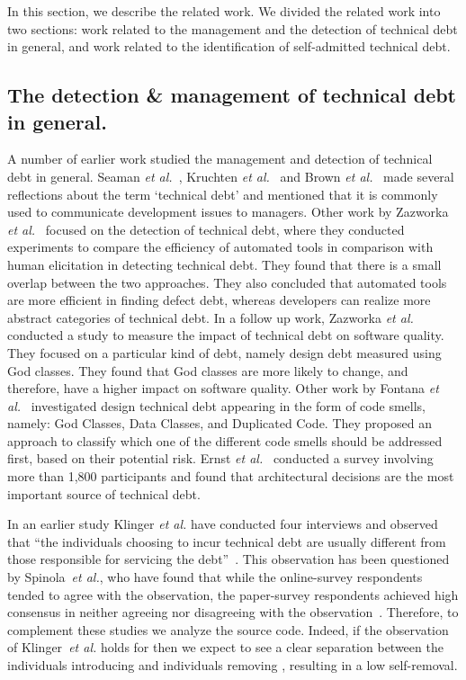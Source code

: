 
In this section, we describe the related work. We divided the related work into two sections: work related to the management and the detection of technical debt in general, and work related to the identification of self-admitted technical debt.

\subsection{The detection \& management of technical debt in general.} A number of earlier work studied the management and detection of technical debt in general. Seaman \textit{et al.}~\cite{Seaman2011}, Kruchten \textit{et al.}~\cite{Kruchten2013IWMTD} and Brown \textit{et al.}~\cite{Brown2010MTD} made several reflections about the term `technical debt' and mentioned that it is commonly used to communicate development issues to managers. Other work by Zazworka \textit{et al.}~\cite{Zazworka2013EASE} focused on the detection of technical debt, where they conducted experiments to compare the efficiency of automated tools in comparison with human elicitation in detecting technical debt. They found that there is a small overlap between the two approaches. They also concluded that automated tools are more efficient in finding defect debt, whereas developers can realize more abstract categories of technical debt. In a follow up work, Zazworka \textit{et al.}~\cite{Zazworka2011MTD} conducted a study to measure the impact of technical debt on software quality. They focused on a particular kind of debt, namely design debt measured using God classes. They found that God classes are more likely to change, and therefore, have a higher impact on software quality. Other work by Fontana \textit{et al.}~\cite{Fontana2012MTD} investigated design technical debt appearing in the form of code smells, namely: God Classes, Data Classes, and Duplicated Code. They proposed an approach to classify which one of the different code smells should be addressed first, based on their potential risk. Ernst \textit{et al.}~\cite{Ernst2015FSE} conducted a survey involving more than 1,800 participants and found that architectural decisions are the most important source of technical debt.



In an earlier study Klinger \textit{et al.} have conducted four interviews and observed that ``the individuals choosing to incur technical debt are usually different from those responsible for servicing the debt''~\cite{Klinger:etal}. 
This observation has been questioned by Spinola~\textit{et al.}, who have found that while the online-survey respondents tended to agree with the observation, the paper-survey respondents achieved high consensus in neither agreeing nor disagreeing with the observation~\cite{Spinola:etal}. Therefore, to complement these studies we analyze the source code.
Indeed, if the observation of Klinger~\textit{et al.} holds for \SATD then we expect to see a clear separation between the individuals introducing \SATD and individuals removing \SATD, resulting in a low \SATD self-removal.

